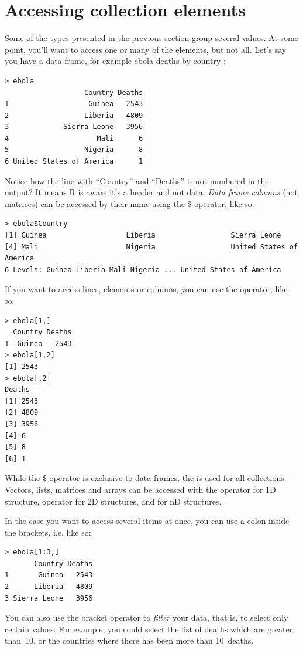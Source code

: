 \documentclass{report}
\newcommand{\code}[1]{\textsf{\ttfamily #1}}
\begin{document}
	\section{Accessing collection elements}\label{sec:access}
	Some of the types presented in the previous section group several values. At some point, you'll want to access one or many of the elements, but not all. Let's say you have a data frame, for example ebola deaths by country \cite{who}:
	\begin{verbatim}
> ebola
                   Country Deaths
1                   Guinea   2543
2                  Liberia   4809
3             Sierra Leone   3956
4                     Mali      6
5                  Nigeria      8
6 United States of America      1
	\end{verbatim}
	Notice how the line with ``Country'' and ``Deaths'' is not numbered in the output? It means R is aware it's a header and not data. \emph{Data frame columns} (not matrices) can be accessed by their name using the \code{\$} operator, like so:
	\begin{verbatim}
> ebola$Country
[1] Guinea                   Liberia                  Sierra Leone            
[4] Mali                     Nigeria                  United States of America
6 Levels: Guinea Liberia Mali Nigeria ... United States of America
	\end{verbatim}
	If you want to access lines, elements or columns, you can use the \code{[row, column]} operator, like so:
	\begin{verbatim}
> ebola[1,]
  Country Deaths
1  Guinea   2543
> ebola[1,2]
[1] 2543
> ebola[,2]
Deaths
[1] 2543
[2] 4809
[3] 3956
[4] 6
[5] 8
[6] 1
	\end{verbatim}
	While the \code{\$} operator is exclusive to data frames, the \code{[]} is used for all collections. Vectors, lists, matrices and arrays can be accessed with the \code{[index]} operator for 1D structure, \code{[row, column]} operator for 2D structures, and \code{[i, j, k...]} for nD structures.

	In the case you want to access several items at once, you can use a colon inside the brackets, i.e. \code{[begin:end]} like so:
	\begin{verbatim}
> ebola[1:3,]
       Country Deaths
1       Guinea   2543
2      Liberia   4809
3 Sierra Leone   3956
	\end{verbatim}
	
	You can also use the bracket operator to \emph{filter} your data, that is, to select only certain values. For example, you could select the list of deaths which are greater than~10, or the countries where there has been more than 10~deaths.
	
\end{document}
